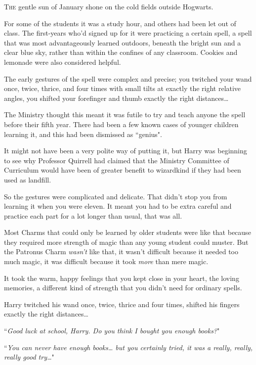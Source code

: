 
\lettrine{T}{he} gentle sun of January shone on the cold fields outside Hogwarts.

For some of the students it was a study hour, and others had been let out of class. The first-years who'd signed up for it were practicing a certain spell, a spell that was most advantageously learned outdoors, beneath the bright sun and a clear blue sky, rather than within the confines of any classroom. Cookies and lemonade were also considered helpful.

The early gestures of the spell were complex and precise; you twitched your wand once, twice, thrice, and four times with small tilts at exactly the right relative angles, you shifted your forefinger and thumb exactly the right distances{\ldots}

The Ministry thought this meant it was futile to try and teach anyone the spell before their fifth year. There had been a few known cases of younger children learning it, and this had been dismissed as ``genius".

It might not have been a very polite way of putting it, but Harry was beginning to see why Professor Quirrell had claimed that the Ministry Committee of Curriculum would have been of greater benefit to wizardkind if they had been used as landfill.

So the gestures were complicated and delicate. That didn't stop you from learning it when you were eleven. It meant you had to be extra careful and practice each part for a lot longer than usual, that was all.

Most Charms that could only be learned by older students were like that because they required more strength of magic than any young student could muster. But the Patronus Charm \emph{wasn't} like that, it wasn't difficult because it needed too much magic, it was difficult because it took \emph{more} than mere magic.

It took the warm, happy feelings that you kept close in your heart, the loving memories, a different kind of strength that you didn't need for ordinary spells.

Harry twitched his wand once, twice, thrice and four times, shifted his fingers exactly the right distances{\ldots}

``\emph{Good luck at school, Harry. Do you think I bought you enough books?}"

``\emph{You can never have enough books{\ldots} but you certainly tried, it was a really, really, really good try{\ldots}}"

